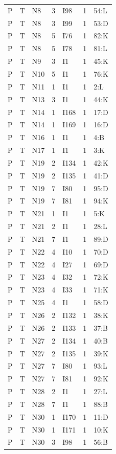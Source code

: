 {\begin{longtable}{lllrlrp{.35\linewidth}}
P & T & N8 & 3 & I98 & 1 & 54:L \\
P & T & N8 & 3 & I99 & 1 & 53:D \\
P & T & N8 & 5 & I76 & 1 & 82:K \\
P & T & N8 & 5 & I78 & 1 & 81:L \\
P & T & N9 & 3 & I1 & 1 & 45:K \\
P & T & N10 & 5 & I1 & 1 & 76:K \\
P & T & N11 & 1 & I1 & 1 & 2:L \\
P & T & N13 & 3 & I1 & 1 & 44:K \\
P & T & N14 & 1 & I168 & 1 & 17:D \\
P & T & N14 & 1 & I169 & 1 & 16:D \\
P & T & N16 & 1 & I1 & 1 & 4:B \\
P & T & N17 & 1 & I1 & 1 & 3:K \\
P & T & N19 & 2 & I134 & 1 & 42:K \\
P & T & N19 & 2 & I135 & 1 & 41:D \\
P & T & N19 & 7 & I80 & 1 & 95:D \\
P & T & N19 & 7 & I81 & 1 & 94:K \\
P & T & N21 & 1 & I1 & 1 & 5:K \\
P & T & N21 & 2 & I1 & 1 & 28:L \\
P & T & N21 & 7 & I1 & 1 & 89:D \\
P & T & N22 & 4 & I10 & 1 & 70:D \\
P & T & N22 & 4 & I27 & 1 & 69:D \\
P & T & N23 & 4 & I32 & 1 & 72:K \\
P & T & N23 & 4 & I33 & 1 & 71:K \\
P & T & N25 & 4 & I1 & 1 & 58:D \\
P & T & N26 & 2 & I132 & 1 & 38:K \\
P & T & N26 & 2 & I133 & 1 & 37:B \\
P & T & N27 & 2 & I134 & 1 & 40:B \\
P & T & N27 & 2 & I135 & 1 & 39:K \\
P & T & N27 & 7 & I80 & 1 & 93:L \\
P & T & N27 & 7 & I81 & 1 & 92:K \\
P & T & N28 & 2 & I1 & 1 & 27:L \\
P & T & N28 & 7 & I1 & 1 & 88:B \\
P & T & N30 & 1 & I170 & 1 & 11:D \\
P & T & N30 & 1 & I171 & 1 & 10:K \\
P & T & N30 & 3 & I98 & 1 & 56:B \\

\end{longtable}}
